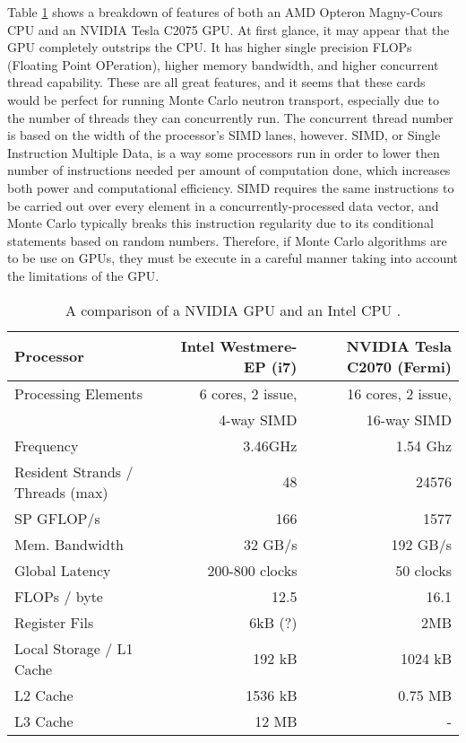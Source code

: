 Table \ref{gpu_cpu_comp} shows a breakdown of features of both an AMD Opteron Magny-Cours CPU and an NVIDIA Tesla C2075 GPU.  At first glance, it may appear that the GPU completely outstrips the CPU.  It has higher single precision FLOPs (Floating Point OPeration), higher memory bandwidth, and higher concurrent thread capability.  These are all great features, and it seems that these cards would be perfect for running Monte Carlo neutron transport, especially due to the number of threads they can concurrently run.  The concurrent thread number is based on the width of the processor's SIMD lanes, however.  SIMD, or Single Instruction Multiple Data, is a way some processors run in order to lower then number of instructions needed per amount of computation done, which increases both power and computational efficiency.  SIMD requires the same instructions to be carried out over every element  in a concurrently-processed data vector, and Monte Carlo typically breaks this instruction regularity due to its conditional statements based on random numbers.  Therefore, if Monte Carlo algorithms are to be use on GPUs, they must be execute in a careful manner taking into account the limitations of the GPU.

\begin{table}[h]
\centering
\caption{A comparison of a NVIDIA GPU and an Intel CPU \cite{cent, cpu_latency}.}
\label{gpu_cpu_comp}
\begin{tabular}{| l | r | r |}
\hline
Processor & Intel Westmere-EP (i7) & NVIDIA Tesla C2070 (Fermi) \\
\hline
\hline
Processing Elements & 6 cores, 2 issue, & 16 cores, 2 issue, \\
& 4-way SIMD &  16-way SIMD  \\
\hline
Frequency & 3.46GHz &  1.54 Ghz \\
\hline
Resident Strands / Threads (max) & 48 & 24576 \\
\hline
SP GFLOP/s & 166 & 1577 \\
\hline
Mem. Bandwidth &  32 GB/s & 192 GB/s \\
\hline
Global Latency & 200-800 clocks & ~50 clocks \\
\hline
FLOPs / byte & 12.5  & 16.1 \\
\hline
Register Fils & 6kB (?) & 2MB \\
\hline
Local Storage / L1 Cache & 192 kB & 1024 kB \\
\hline
L2 Cache & 1536 kB & 0.75 MB \\
\hline
L3 Cache & 12 MB & - \\
\hline
\end{tabular}
\end{table}

